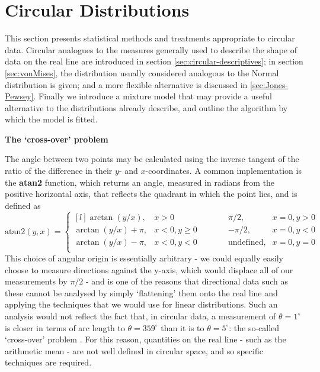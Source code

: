 \documentclass[../../ArchStats.tex]{subfiles}
\begin{document}
\section{Circular Distributions}
\label{sec:circular-distributions}

This section presents statistical methods and treatments appropriate to circular data. Circular analogues to the measures generally used to describe the shape of data on the real line are introduced in section \ref{sec:circular-descriptives}; in section \ref{sec:vonMises}, the distribution usually considered analogous to the Normal distribution is given; and a more flexible alternative is discussed in \ref{sec:Jones-Pewsey}. Finally we introduce a mixture model that may provide a useful alternative to the distributions already describe, and outline the algorithm by which the model is fitted.

\textbf{The `cross-over' problem}

The angle between two points may be calculated using the inverse tangent of the ratio of the difference in their $y$- and $x$-coordinates. A common implementation is the \textbf{atan2} function, which returns an angle, measured in radians from the positive horizontal axis, that reflects the quadrant in which the point lies, and is defined as
	\begin{equation}
	\label{eqn:atan2}
	\text{atan2} (y, x) = \left\lbrace \begin{matrix*}[l]
	\arctan(y/x), & x > 0 & \, \, \, \, &  \, \, \, \, &\pi/2, & x = 0, y > 0 \\
	\arctan(y/x) + \pi, & x < 0, y \geq 0 & \, \, \, \, &  \, \, \, \, &-\pi/2, & x = 0, y < 0 \\
	\arctan(y/x) - \pi, & x < 0, y < 0 & \, \, \, \, &  \, \, \, \, &\text{undefined}, & x = 0, y = 0 \\
	\end{matrix*} \right. 
	\end{equation}
This choice of angular origin is essentially arbitrary - we could equally easily choose to measure directions against the y-axis, which would displace all of our measurements by $\pi/2$ - and is one of the reasons that directional  data such as these cannot be analysed by simply `flattening' them onto the real line and applying the techniques that we would use for linear distributions. Such an analysis would not reflect the fact that, in circular data, a measurement of $\theta = 1^\circ$ is closer in terms of arc length to $\theta = 359^\circ$ than it is to $\theta = 5^\circ$: the so-called `cross-over' problem \cite{Fisher1993}.  For this reason, quantities on the real line - such as the arithmetic mean - are not well defined in circular space, and so specific techniques are required.
\end{document}
